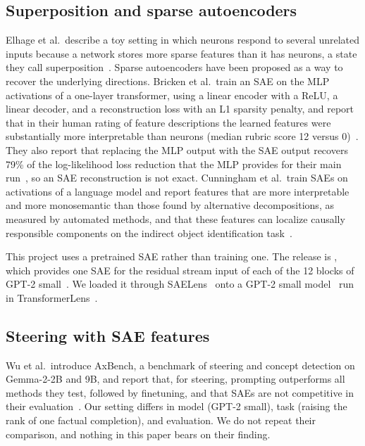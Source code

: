 \documentclass[conference]{IEEEtran}
\newcommand{\code}[1]{\texttt{\detokenize{#1}}}
\begin{document}
\subsection{Superposition and sparse autoencoders}
Elhage et al.\ describe a toy setting in which neurons respond to several unrelated inputs because a network stores more sparse features than it has neurons, a state they call superposition~\cite{elhage2022superposition}. Sparse autoencoders have been proposed as a way to recover the underlying directions. Bricken et al.\ train an SAE on the MLP activations of a one-layer transformer, using a linear encoder with a ReLU, a linear decoder, and a reconstruction loss with an L1 sparsity penalty, and report that in their human rating of feature descriptions the learned features were substantially more interpretable than neurons (median rubric score 12 versus 0)~\cite{bricken2023towards}. They also report that replacing the MLP output with the SAE output recovers 79\% of the log-likelihood loss reduction that the MLP provides for their main run~\cite{bricken2023towards}, so an SAE reconstruction is not exact. Cunningham et al.\ train SAEs on activations of a language model and report features that are more interpretable and more monosemantic than those found by alternative decompositions, as measured by automated methods, and that these features can localize causally responsible components on the indirect object identification task~\cite{cunningham2023sparse}.

This project uses a pretrained SAE rather than training one. The release is \code{gpt2-small-res-jb}, which provides one SAE for the residual stream input of each of the 12 blocks of GPT-2 small~\cite{bloom2024gpt2saes}. We loaded it through SAELens~\cite{bloom2024saelens} onto a GPT-2 small model~\cite{radford2019gpt2} run in TransformerLens~\cite{nanda2022transformerlens}.

\subsection{Steering with SAE features}
Wu et al.\ introduce AxBench, a benchmark of steering and concept detection on Gemma-2-2B and 9B, and report that, for steering, prompting outperforms all methods they test, followed by finetuning, and that SAEs are not competitive in their evaluation~\cite{wu2025axbench}. Our setting differs in model (GPT-2 small), task (raising the rank of one factual completion), and evaluation. We do not repeat their comparison, and nothing in this paper bears on their finding.
\end{document}
